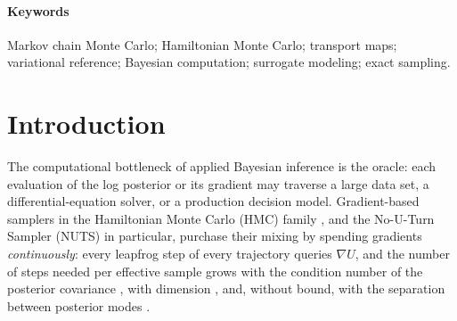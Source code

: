 \documentclass[11pt]{article}
\theoremstyle{remark}
\begin{document}
\begin{abstract}
flat in dimension $d\in[50,200]$ at fixed residual dimension, and flat in
mode separation where NUTS ceases to switch modes while reporting high
within-mode effective sample size. On a 37-posterior benchmark drawn
from \emph{posteriordb}, judged against gold-standard reference draws
under a symmetric accuracy gate, PMR-HMC is the best of a ten-method
panel---diagonal- and dense-mass NUTS, Pathfinder-initialized dense
NUTS, ChEES, MCLMC, and four flow-based samplers (TESS,
flow-based independence MH, a flowMC-style hybrid, NeuTra)---on 34 of
37 posteriors, with median advantages, over rows where both samplers
pass the gate, of $38\times$ over diagonal NUTS, $4.1\times$ over
dense NUTS, $10$--$12\times$ over ChEES and MCLMC (which pass on only
$11$ and $19$ of 37 rows), and $29$--$95\times$ over the flow-based
samplers, which fail the accuracy gate outright on the large majority
of posteriors (cross-seed rank-$\widehat R\le1.05$ everywhere except
the two disclosed accuracy failures); a curated 30-target controlled
stress panel that deliberately retains every known failure family
localizes where the method wins and loses, with every accuracy failure
attributable to a named missing chart class or warm-up budget and the
efficiency losses concentrated on smooth, well-scaled targets. A
production boundary study localizes the failure of any single global
map at $d\approx600$ via a measured per-coordinate fidelity law, and a
delayed-rejection hybrid restores gate-passing quality there at
$2$--$5\times$ the speed of the production NUTS baseline (single-seed
prototype). A native C production
kernel attains $0.13$--$385\,\mu$s per draw; end-to-end wall clock
crosses over in PMR-HMC's favor beyond a median budget of
$\approx4{,}500$ effective samples.
\end{abstract}

\paragraph{Keywords} Markov chain Monte Carlo; Hamiltonian Monte Carlo;
transport maps; variational reference; Bayesian computation; surrogate
modeling; exact sampling.

\section{Introduction}\label{sec:intro}
The computational bottleneck of applied Bayesian inference is the oracle:
each evaluation of the log posterior or its gradient may traverse a large
data set, a differential-equation solver, or a production decision model.
Gradient-based samplers in the Hamiltonian Monte Carlo (HMC) family
\citep{duane1987,neal2011}, and the No-U-Turn Sampler (NUTS)
\citep{hoffman2014} in particular, purchase their mixing by spending
gradients \emph{continuously}: every leapfrog step of every trajectory
queries $\nabla U$, and the number of steps needed per effective sample
grows with the condition number of the posterior covariance
\citep{neal2011,langmore2019}, with dimension \citep{beskos2013}, and,
without bound, with the separation between posterior modes
\citep{mangoubi2018}.
\end{document}
